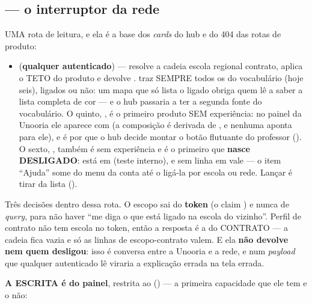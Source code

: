 \subsection{ --- o interruptor da rede}

UMA rota de leitura, e ela é a base dos \emph{cards} do hub e do 404 das rotas de
produto:

\begin{itemize}
  \item {} (\textbf{qualquer autenticado}) --- resolve
    a cadeia escola \seta{} regional \seta{} contrato, aplica o TETO do produto e
    devolve .  traz SEMPRE todos os
    do vocabulário (hoje seis), ligados ou não: um mapa que só lista o ligado
    obriga quem lê a saber a lista completa de cor --- e o hub passaria a ter a
    segunda fonte do vocabulário. O quinto, , é o primeiro
    produto SEM experiência: no painel da Unooria ele aparece com
     (a composição é derivada de , e
    nenhuma aponta para ele), e é por  que
    o hub decide montar o botão flutuante do professor (). O
    sexto, , também é sem experiência e é o primeiro que
    \textbf{nasce DESLIGADO}: está em 
    (teste interno), e sem linha em  vale
     --- o item \enquote{Ajuda} some do menu da conta
    até o  ligá-la por escola ou rede. Lançar é tirar da lista
    ().
\end{itemize}

Três decisões dentro dessa rota. O escopo sai do \textbf{token} (o claim
) e nunca de \emph{query}, para não haver \enquote{me diga o que
está ligado na escola do vizinho}. Perfil de contrato não tem escola no token,
então a resposta é a do CONTRATO --- a cadeia fica vazia e só as linhas de
escopo-contrato valem. E ela \textbf{não devolve  nem quem
desligou}: isso é conversa entre a Unooria e a rede, e num \emph{payload} que
qualquer autenticado lê viraria a explicação errada na tela errada.

\textbf{A ESCRITA é do painel}, restrita ao  () — a
primeira capacidade que ele tem e o  não:

